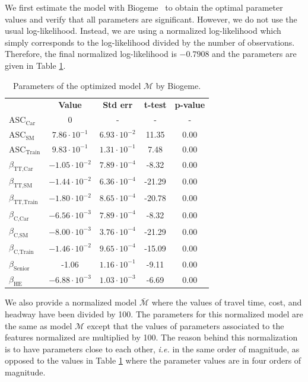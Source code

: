 \documentclass[conference]{IEEEtran}
\newcommand{\E}[1]{\cdot10^{#1}}
\begin{document}
We first estimate the model with Biogeme~\cite{bierlaire_biogeme:_2003} to obtain the optimal parameter values and verify that all parameters are significant. However, we do not use the usual log-likelihood. Instead, we are using a normalized log-likelihood which simply corresponds to the log-likelihood divided by the number of observations. Therefore, the final normalized log-likelihood is $-0.7908$ and the parameters are given in Table \ref{tab:res_biogeme}.\\

\begin{table}
\centering
\renewcommand\arraystretch{1.2}
\begin{tabular}{l|cccc}
\multicolumn{1}{l}{} & {\bf Value} & {\bf Std err} & {\bf t-test} & {\bf p-value} \\ \cline{2-5}
$\text{ASC}_{\text{Car}}$ & 0 & - & - & - \\
$\text{ASC}_{\text{SM}}$ & $7.86\E{-1}$ & $6.93\E{-2}$ & 11.35 & 0.00 \\
$\text{ASC}_{\text{Train}}$ & $9.83\E{-1}$ & $1.31\E{-1}$ & 7.48 & 0.00 \\
$\beta_{\text{TT,Car}}$ & $-1.05\E{-2}$ & $7.89\E{-4}$ & -8.32 & 0.00 \\
$\beta_{\text{TT,SM}}$ & $-1.44\E{-2}$ & $6.36\E{-4}$ & -21.29 & 0.00 \\
$\beta_{\text{TT,Train}}$ & $-1.80\E{-2}$ & $8.65\E{-4}$ & -20.78 & 0.00 \\
$\beta_{\text{C,Car}}$ & $-6.56\E{-3}$ & $7.89\E{-4}$ & -8.32 & 0.00 \\
$\beta_{\text{C,SM}}$ & $-8.00\E{-3}$ & $3.76\E{-4}$ & -21.29 & 0.00 \\
$\beta_{\text{C,Train}}$ & $-1.46\E{-2}$ & $9.65\E{-4}$ & -15.09 & 0.00 \\
$\beta_{\text{Senior}}$ & -1.06 & $1.16\E{-1}$ & -9.11 & 0.00 \\
$\beta_{\text{HE}}$ & $-6.88\E{-3}$ & $1.03\E{-3}$ & -6.69 & 0.00
\end{tabular}
\caption{\label{tab:res_biogeme} Parameters of the optimized model $\mathcal{M}$ by Biogeme.}
\vspace{-0.5cm}
\end{table}

We also provide a normalized model $\bar{\mathcal{M}}$ where the values of travel time, cost, and headway have been divided by 100. The parameters for this normalized model are the same as model $\mathcal{M}$ except that the values of parameters associated to the features normalized are multiplied by 100. The reason behind this normalization is to have parameters close to each other, {\it i.e.} in the same order of magnitude, as opposed to the values in Table \ref{tab:res_biogeme} where the parameter values are in four orders of magnitude. \\
\end{document}

